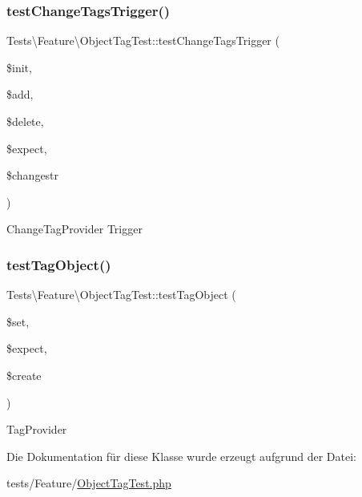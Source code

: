 \subsubsection{\texorpdfstring{test\+Change\+Tags\+Trigger()}{testChangeTagsTrigger()}}
{\footnotesize\ttfamily Tests\textbackslash{}\+Feature\textbackslash{}\+Object\+Tag\+Test\+::test\+Change\+Tags\+Trigger (\begin{DoxyParamCaption}\item[{}]{\$init,  }\item[{}]{\$add,  }\item[{}]{\$delete,  }\item[{}]{\$expect,  }\item[{}]{\$changestr }\end{DoxyParamCaption})}

Change\+Tag\+Provider  Trigger \mbox{\label{classTests_1_1Feature_1_1ObjectTagTest_ab58efd7b7f70a989839b59ba36a7e684}} 
\subsubsection{\texorpdfstring{test\+Tag\+Object()}{testTagObject()}}
{\footnotesize\ttfamily Tests\textbackslash{}\+Feature\textbackslash{}\+Object\+Tag\+Test\+::test\+Tag\+Object (\begin{DoxyParamCaption}\item[{}]{\$set,  }\item[{}]{\$expect,  }\item[{}]{\$create }\end{DoxyParamCaption})}

Tag\+Provider 

Die Dokumentation für diese Klasse wurde erzeugt aufgrund der Datei\+:\begin{DoxyCompactItemize}
\item 
tests/\+Feature/\hyperlink{ObjectTagTest_8php}{Object\+Tag\+Test.\+php}\end{DoxyCompactItemize}
